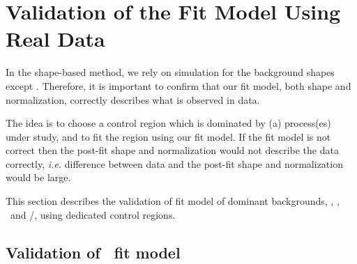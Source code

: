 


\section{Validation of the Fit Model Using Real Data}

In the shape-based method, we rely on simulation for the background shapes 
except \Wjets. Therefore, it is important to confirm that our fit model,
both shape and normalization, correctly describes what is observed in data. 

The idea is to choose a control region which is dominated by (a) process(es) 
under study, and to fit the region using our fit model.  
If the fit model is not correct then the post-fit shape 
and normalization would not describe the data correctly, 
\textit{i.e.} difference between data and the post-fit shape and normalization
would be large. 

This section describes the validation of fit model of dominant backgrounds, 
\qqww, \topbkg, \Wjets\ and \wgamma/\wgammastar, using dedicated control regions. 

\subsection{Validation of \qqww\ fit model}  

